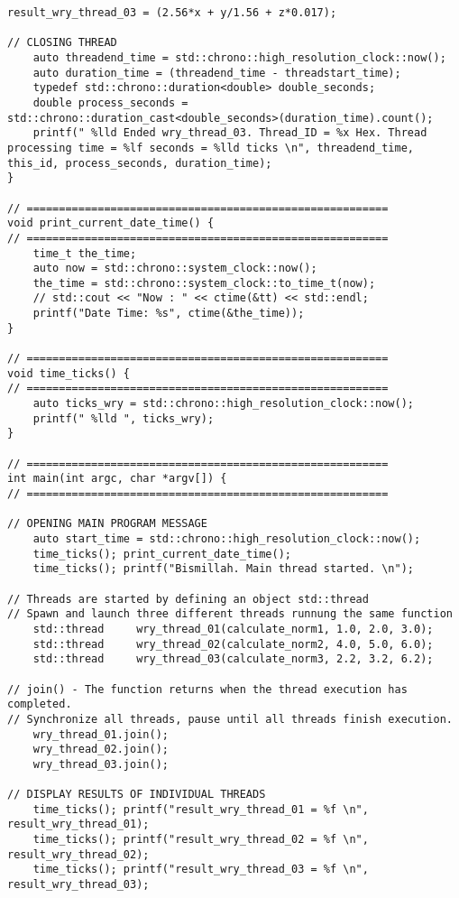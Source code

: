 \begin{lstlisting}[caption={App4-C++2011 Example Parallel Multithreading}, label=App4-C++2011 Example Parallel Multithreading]
	result_wry_thread_03 = (2.56*x + y/1.56 + z*0.017); 

// CLOSING THREAD
	auto threadend_time = std::chrono::high_resolution_clock::now();
	auto duration_time = (threadend_time - threadstart_time);
	typedef std::chrono::duration<double> double_seconds;
	double process_seconds = std::chrono::duration_cast<double_seconds>(duration_time).count();
	printf(" %lld Ended wry_thread_03. Thread_ID = %x Hex. Thread processing time = %lf seconds = %lld ticks \n", threadend_time, this_id, process_seconds, duration_time);
}

// ========================================================
void print_current_date_time() {
// ========================================================
	time_t the_time;
	auto now = std::chrono::system_clock::now();
	the_time = std::chrono::system_clock::to_time_t(now);
	// std::cout << "Now : " << ctime(&tt) << std::endl;
	printf("Date Time: %s", ctime(&the_time));
}

// ========================================================
void time_ticks() {
// ========================================================
	auto ticks_wry = std::chrono::high_resolution_clock::now();
	printf(" %lld ", ticks_wry);
}

// ========================================================
int main(int argc, char *argv[]) {
// ========================================================

// OPENING MAIN PROGRAM MESSAGE
	auto start_time = std::chrono::high_resolution_clock::now();
	time_ticks(); print_current_date_time();
	time_ticks(); printf("Bismillah. Main thread started. \n");

// Threads are started by defining an object std::thread
// Spawn and launch three different threads runnung the same function
	std::thread 	wry_thread_01(calculate_norm1, 1.0, 2.0, 3.0);     
	std::thread 	wry_thread_02(calculate_norm2, 4.0, 5.0, 6.0);        
	std::thread 	wry_thread_03(calculate_norm3, 2.2, 3.2, 6.2);    

// join() - The function returns when the thread execution has completed.
// Synchronize all threads, pause until all threads finish execution.
	wry_thread_01.join();
	wry_thread_02.join();
	wry_thread_03.join();

// DISPLAY RESULTS OF INDIVIDUAL THREADS
	time_ticks(); printf("result_wry_thread_01 = %f \n", result_wry_thread_01);
	time_ticks(); printf("result_wry_thread_02 = %f \n", result_wry_thread_02);
	time_ticks(); printf("result_wry_thread_03 = %f \n", result_wry_thread_03);
	

\end{lstlisting}
